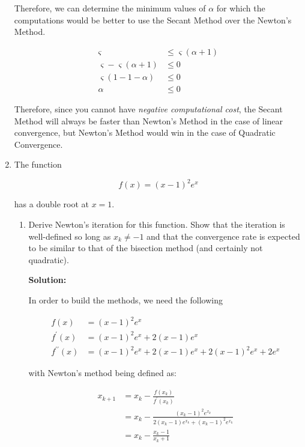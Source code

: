 \documentclass[12pt]{article}
\newcommand{\pprime}{\prime \prime}
\begin{document}
\begin{enumerate}
Therefore, we can determine the minimum values of $\alpha$ for which the computations would be
better to use the Secant Method over the Newton's Method.

\begin{align*}
  \varsigma &\leq \varsigma(\alpha + 1)\\
  \varsigma - \varsigma(\alpha + 1) &\leq 0\\
  \varsigma(1 - 1 - \alpha) &\leq 0\\
  \alpha &\leq 0
\end{align*}

Therefore, since you cannot have {\em negative computational cost}, the Secant Method
will always be faster than Newton's Method in the case of linear convergence, but
Newton's Method would win in the case of Quadratic Convergence.


\item The function

\[
f(x) = (x-1)^{2}e^{x}
\]

has a double root at $x = 1$.

\begin{enumerate}
\item Derive Newton's iteration for this function. Show that the iteration is well-defined
so long as $x_{k} \neq -1$ and that the convergence rate is expected to be similar to that
of the bisection method (and certainly not quadratic).

{\bf Solution:}

In order to build the methods, we need the following

\begin{align*}
f(x) &= (x-1)^{2}e^{x}\\
f^{\prime}(x) &= (x-1)^{2}e^{x} + 2(x-1)e^{x}\\
f^{\pprime}(x) &= (x-1)^{2}e^{x} + 2(x-1)e^{x} + 2(x-1)^{2}e^{x} + 2e^{x}
\end{align*}

with Newton's method being defined as:

\begin{align*}
x_{k+1} &= x_{k} - \frac{f\left(x_{k}\right)}{f^{\prime}\left(x_{k}\right)}\\
        &= x_{k} - \frac{\left(x_{k}-1\right)^{2}e^{x_{k}}}{2\left(x_{k}-1\right)e^{x_{k}} + \left( x_{k} - 1\right)^{2}e^{x_{k}}}\\
        &= x_{k} - \frac{x_{k}-1}{x_{k} + 1}
\end{align*}


\end{enumerate}
\end{enumerate}
\end{document}
